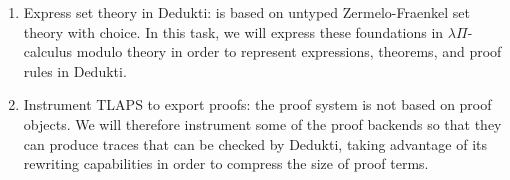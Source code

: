 
\begin{enumerate}
\item Express \tlaplus set theory in Dedukti: \tlaplus is based on untyped
  Zermelo-Fraenkel set theory with choice. In this task, we will express these
  foundations in $\lambda\Pi$-calculus modulo theory in order to represent
  \tlaplus expressions, theorems, and proof rules in Dedukti.
\item Instrument TLAPS to export proofs: the \tlaplus proof system is not based
  on proof objects. We will therefore instrument some of the proof backends so
  that they can produce traces that can be checked by Dedukti, taking advantage
  of its rewriting capabilities in order to compress the size of proof terms.
\end{enumerate}




